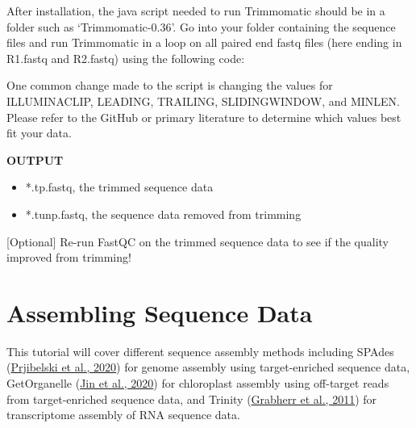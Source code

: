 \documentclass[
  12pt,
]{article}
\newenvironment{Shaded}{\begin{snugshade}}{\end{snugshade}}
\newcommand{\AttributeTok}[1]{\textcolor[rgb]{0.13,0.29,0.53}{#1}}
\newcommand{\BuiltInTok}[1]{#1}
\newcommand{\CommentTok}[1]{\textcolor[rgb]{0.56,0.35,0.01}{\textit{#1}}}
\newcommand{\ControlFlowTok}[1]{\textcolor[rgb]{0.13,0.29,0.53}{\textbf{#1}}}
\newcommand{\ExtensionTok}[1]{#1}
\newcommand{\FunctionTok}[1]{\textcolor[rgb]{0.13,0.29,0.53}{\textbf{#1}}}
\newcommand{\KeywordTok}[1]{\textcolor[rgb]{0.13,0.29,0.53}{\textbf{#1}}}
\newcommand{\NormalTok}[1]{#1}
\newcommand{\OperatorTok}[1]{\textcolor[rgb]{0.81,0.36,0.00}{\textbf{#1}}}
\newcommand{\PreprocessorTok}[1]{\textcolor[rgb]{0.56,0.35,0.01}{\textit{#1}}}
\newcommand{\StringTok}[1]{\textcolor[rgb]{0.31,0.60,0.02}{#1}}
\newcommand{\VariableTok}[1]{\textcolor[rgb]{0.00,0.00,0.00}{#1}}
\providecommand{\tightlist}{%
  \setlength{\itemsep}{0pt}\setlength{\parskip}{0pt}}
\begin{document}
After installation, the java script needed to run Trimmomatic should be in a folder such as `Trimmomatic-0.36'. Go into your folder containing the sequence files and run Trimmomatic in a loop on all paired end fastq files (here ending in R1.fastq and R2.fastq) using the following code:

\begin{Shaded}
\end{Shaded}

One common change made to the script is changing the values for ILLUMINACLIP, LEADING, TRAILING, SLIDINGWINDOW, and MINLEN. Please refer to the GitHub or primary literature to determine which values best fit your data.

\textbf{OUTPUT}

\begin{itemize}
\tightlist
\item
  *.tp.fastq, the trimmed sequence data
\item
  *.tunp.fastq, the sequence data removed from trimming
\end{itemize}

{[}Optional{]} Re-run FastQC on the trimmed sequence data to see if the quality improved from trimming!

\hypertarget{assembling-sequence-data}{%
\section{Assembling Sequence Data}\label{assembling-sequence-data}}

This tutorial will cover different sequence assembly methods including SPAdes (\protect\hyperlink{ref-Prjibelski2020}{Prjibelski et al., 2020}) for genome assembly using target-enriched sequence data, GetOrganelle (\protect\hyperlink{ref-Jin2020}{Jin et al., 2020}) for chloroplast assembly using off-target reads from target-enriched sequence data, and Trinity (\protect\hyperlink{ref-Grabherr2011}{Grabherr et al., 2011}) for transcriptome assembly of RNA sequence data.
\end{document}
